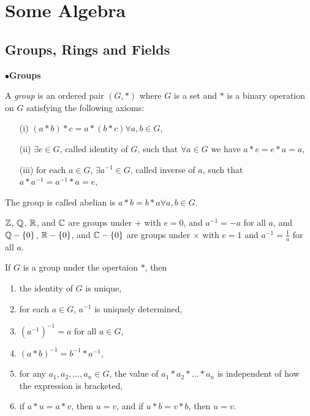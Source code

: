\chapter{Some Algebra}

\section{Groups, Rings and Fields}

\hspace{12pt}$\bullet$\textbf{Groups}

\begin{definition}
  A \textit{group} is an ordered pair $(G,\ast)$ where $G$ is a set and $\ast$ is a binary
  operation on $G$ satisfying the following axioms:

  \begin{itemize}
    \item[(i)]{
        $(a\ast b)\ast c=a\ast(b\ast c)\forall a,b\in G$,
      }
    \item[(ii)]{
        $\exists e\in G$, called identity of $G$, such that $\forall a\in G$ we have
        $a\ast e=e\ast a=a$,
      }
    \item[(iii)]{
        for each $a\in G$, $\exists a^{-1}\in G$, called inverse of $a$, such that
        $a\ast a^{-1}=a^{-1}\ast a=e$,
      }
  \end{itemize}

  The group is called abelian is $a\ast b=b\ast a\forall a,b\in G$. \cite{dummit}
\end{definition}

\begin{ex}
  $\mathbb{Z}$, $\mathbb{Q}$, $\mathbb{R}$, and $\mathbb{C}$ are groups under $+$ with $e=0$, and $a^{-1}=-a$ for all $a$, and
  $\mathbb{Q}-\{0\}$, $\mathbb{R}-\{0\}$, and $\mathbb{C}-\{0\}$ are groups under $\times$ with $e=1$ and
  $a^{-1}=\frac{1}{a}$ for all $a$.
\end{ex}

\begin{remark}
  If $G$ is a group under the opertaion $\ast$, then

  \begin{enumerate}
    \item{
        the identity of $G$ is unique,
      }
    \item{
        for each $a\in G$, $a^{-1}$ is uniquely determined,
      }
    \item{
        $(a^{-1})^{-1}=a$ for all $a\in G$,
      }
    \item{
        $(a\ast b)^{-1}=b^{-1}\ast a^{-1}$,
      }
    \item{
        for any $a_1,a_2,\ldots,a_n\in G$, the value of $a_1\ast a_2\ast\ldots\ast a_n$ is
        independent of how the expression is bracketed,
      }
    \item{
      if $a\ast u=a\ast v$, then $u=v$, and if $u\ast b=v\ast b$, then $u=v$.
      }
  \end{enumerate}

\end{remark}

